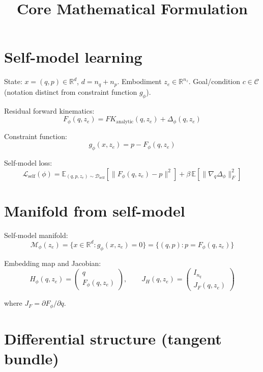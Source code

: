 \documentclass[11pt,a4paper]{article}
\title{Core Mathematical Formulation}
\author{}
\date{}
\newcommand{\R}{\mathbb{R}}
\newcommand{\E}{\mathbb{E}}
\newcommand{\D}{\mathcal{D}}
\newcommand{\Loss}{\mathcal{L}}
\newcommand{\Mphi}{\mathcal{M}_{\phi}}
\begin{document}
\maketitle

\section{Self-model learning}

State: $x = (q, p) \in \R^d$, $d = n_q + n_p$. Embodiment $z_e \in \R^{n_z}$. Goal/condition $c \in \mathcal{C}$ (notation distinct from constraint function $g_\phi$).

Residual forward kinematics:
\begin{equation}
F_\phi(q, z_e) = FK_{\text{analytic}}(q, z_e) + \Delta_\phi(q, z_e)
\end{equation}

Constraint function:
\begin{equation}
g_\phi(x, z_e) = p - F_\phi(q, z_e)
\end{equation}

Self-model loss:
\begin{equation}
\Loss_{\text{self}}(\phi) = \E_{(q, p, z_e) \sim \D_{\text{self}}} \left[ \| F_\phi(q, z_e) - p \|^2 \right] + \beta \, \E \left[ \| \nabla_q \Delta_\phi \|_F^2 \right]
\end{equation}

\section{Manifold from self-model}

Self-model manifold:
\begin{equation}
\Mphi(z_e) = \{ x \in \R^d : g_\phi(x, z_e) = 0 \} = \{ (q, p) : p = F_\phi(q, z_e) \}
\end{equation}

Embedding map and Jacobian:
\begin{equation}
H_\phi(q, z_e) = \begin{pmatrix} q \\ F_\phi(q, z_e) \end{pmatrix}, \qquad J_H(q, z_e) = \begin{pmatrix} I_{n_q} \\ J_F(q, z_e) \end{pmatrix}
\end{equation}

where $J_F = \partial F_\phi / \partial q$.

\section{Differential structure (tangent bundle)}
\end{document}
